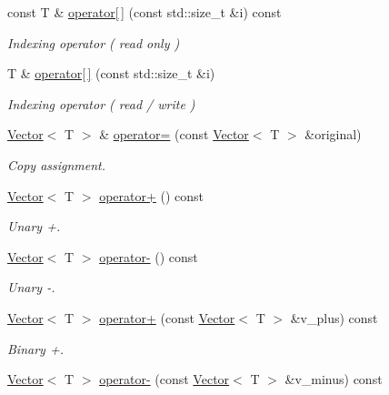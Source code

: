 \begin{DoxyCompactItemize}
const T \& \hyperlink{classLuna_1_1Vector_adb31a846162021be5bc13b33cdbabc1c}{operator\mbox{[}$\,$\mbox{]}} (const std\+::size\+\_\+t \&i) const
\begin{DoxyCompactList}\small\item\em Indexing operator ( read only ) \end{DoxyCompactList}\item 
T \& \hyperlink{classLuna_1_1Vector_ae4e2ff0ca1e504e31453f436f6f733c1}{operator\mbox{[}$\,$\mbox{]}} (const std\+::size\+\_\+t \&i)
\begin{DoxyCompactList}\small\item\em Indexing operator ( read / write ) \end{DoxyCompactList}\item 
\hyperlink{classLuna_1_1Vector}{Vector}$<$ T $>$ \& \hyperlink{classLuna_1_1Vector_af2ee9028f1c40a21a2a4055e63b70b2c}{operator=} (const \hyperlink{classLuna_1_1Vector}{Vector}$<$ T $>$ \&original)
\begin{DoxyCompactList}\small\item\em Copy assignment. \end{DoxyCompactList}\item 
\hyperlink{classLuna_1_1Vector}{Vector}$<$ T $>$ \hyperlink{classLuna_1_1Vector_a98436d0360c521cc7200f3f65201230e}{operator+} () const
\begin{DoxyCompactList}\small\item\em Unary +. \end{DoxyCompactList}\item 
\hyperlink{classLuna_1_1Vector}{Vector}$<$ T $>$ \hyperlink{classLuna_1_1Vector_a8b2f1a6d3c51d317243c2e832411f26d}{operator-\/} () const
\begin{DoxyCompactList}\small\item\em Unary -\/. \end{DoxyCompactList}\item 
\hyperlink{classLuna_1_1Vector}{Vector}$<$ T $>$ \hyperlink{classLuna_1_1Vector_a4250a1034080a224eed0c2cd8ee0fcd2}{operator+} (const \hyperlink{classLuna_1_1Vector}{Vector}$<$ T $>$ \&v\+\_\+plus) const
\begin{DoxyCompactList}\small\item\em Binary +. \end{DoxyCompactList}\item 
\hyperlink{classLuna_1_1Vector}{Vector}$<$ T $>$ \hyperlink{classLuna_1_1Vector_a6fe350a0e81289f65f9d364d669d434d}{operator-\/} (const \hyperlink{classLuna_1_1Vector}{Vector}$<$ T $>$ \&v\+\_\+minus) const

\end{DoxyCompactItemize}
